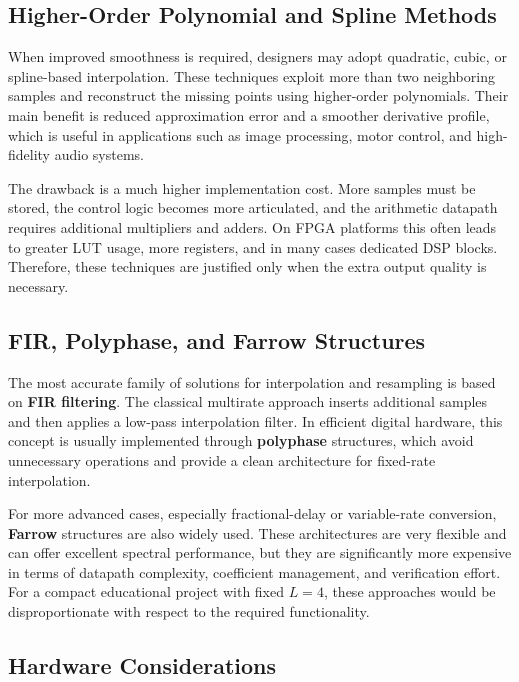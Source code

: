 \documentclass[a4paper,11pt]{article}
\begin{document}
\subsection{Higher-Order Polynomial and Spline Methods}

When improved smoothness is required, designers may adopt quadratic, cubic, or spline-based interpolation. These techniques exploit more than two neighboring samples and reconstruct the missing points using higher-order polynomials. Their main benefit is reduced approximation error and a smoother derivative profile, which is useful in applications such as image processing, motor control, and high-fidelity audio systems.

The drawback is a much higher implementation cost. More samples must be stored, the control logic becomes more articulated, and the arithmetic datapath requires additional multipliers and adders. On FPGA platforms this often leads to greater LUT usage, more registers, and in many cases dedicated DSP blocks. Therefore, these techniques are justified only when the extra output quality is necessary.

\subsection{FIR, Polyphase, and Farrow Structures}

The most accurate family of solutions for interpolation and resampling is based on \textbf{FIR filtering}. The classical multirate approach inserts additional samples and then applies a low-pass interpolation filter. In efficient digital hardware, this concept is usually implemented through \textbf{polyphase} structures, which avoid unnecessary operations and provide a clean architecture for fixed-rate interpolation.

For more advanced cases, especially fractional-delay or variable-rate conversion, \textbf{Farrow} structures are also widely used. These architectures are very flexible and can offer excellent spectral performance, but they are significantly more expensive in terms of datapath complexity, coefficient management, and verification effort. For a compact educational project with fixed $L = 4$, these approaches would be disproportionate with respect to the required functionality.

\subsection{Hardware Considerations}
\end{document}
